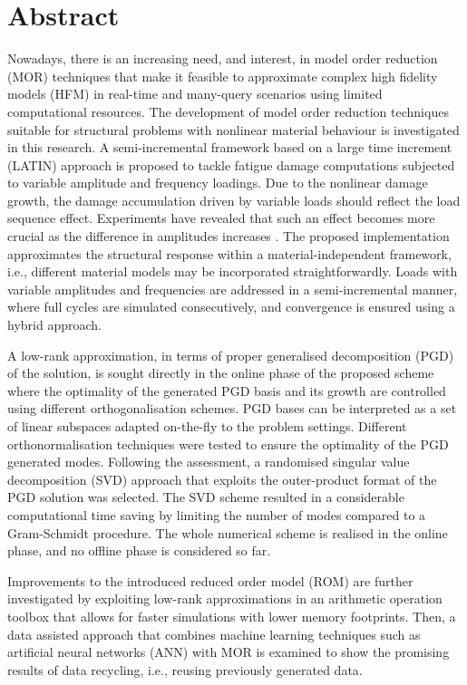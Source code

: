 \chapter*{Abstract}

Nowadays, there is an increasing need, and interest, in model order reduction (MOR) techniques that make it feasible to approximate complex high fidelity models (HFM) in real-time and many-query scenarios using limited computational resources. The development of model order reduction techniques suitable for structural problems with nonlinear material behaviour is investigated in this research. A semi-incremental framework based on a large time increment (LATIN) approach is proposed to tackle fatigue damage computations subjected to variable amplitude and frequency loadings. Due to the nonlinear damage growth, the damage accumulation driven by variable loads should reflect the load sequence effect. Experiments have revealed that such an effect becomes more crucial as the difference in amplitudes increases \parencite{lemaitre2005engineering}.
The proposed implementation approximates the structural response within a material-independent framework, i.e., different material models may be incorporated straightforwardly. Loads with variable amplitudes and frequencies are addressed in a semi-incremental manner, where full cycles are simulated consecutively, and convergence is ensured using a hybrid approach.

A low-rank approximation, in terms of proper generalised decomposition (PGD) of the solution, is sought directly in the online phase of the proposed scheme where the optimality of the generated PGD basis and its growth are controlled using different orthogonalisation schemes. PGD bases can be interpreted as a set of linear subspaces adapted on-the-fly to the problem settings. Different orthonormalisation techniques were tested to ensure the optimality of the PGD generated modes. Following the assessment, a randomised singular value decomposition (SVD) approach that exploits the outer-product format of the PGD solution was selected. The SVD scheme resulted in a considerable computational time saving by limiting the number of modes compared to a Gram-Schmidt procedure. The whole numerical scheme is realised in the online phase, and no offline phase is considered so far.

Improvements to the introduced reduced order model (ROM) are further investigated by exploiting low-rank approximations in an arithmetic operation toolbox that allows for faster simulations with lower memory footprints. Then, a data assisted approach that combines machine learning techniques such as artificial neural networks (ANN) with MOR is examined to show the promising results of data recycling, i.e., reusing previously generated data.

